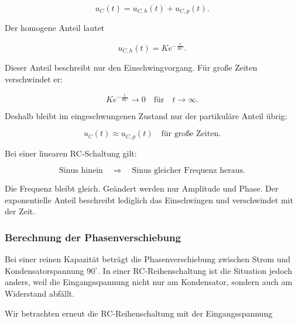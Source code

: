 \begin{equation}
	u_C(t)
	=
	u_{C,h}(t)
	+
	u_{C,p}(t).
	\label{eq:rc-vollstaendige-loesung-h-p}
\end{equation}

Der homogene Anteil lautet

\begin{equation}
	u_{C,h}(t)
	=
	K e^{-\frac{t}{RC}}.
	\label{eq:rc-homogener-anteil-erneut}
\end{equation}

Dieser Anteil beschreibt nur den Einschwingvorgang. Für große Zeiten
verschwindet er:

\begin{equation}
	K e^{-\frac{t}{RC}}
	\rightarrow 0
	\quad \text{für} \quad t \rightarrow \infty.
	\label{eq:rc-homogener-anteil-verschwindet-erneut}
\end{equation}

Deshalb bleibt im eingeschwungenen Zustand nur der partikuläre Anteil übrig:

\begin{equation}
	u_C(t)
	\approx
	u_{C,p}(t)
	\quad \text{für große Zeiten}.
	\label{eq:rc-eingeschwungener-zustand}
\end{equation}

\begin{DidacticBox}
	\label{box:rc-merksatz-stationaere-loesung}
	Bei einer linearen RC-Schaltung gilt:
	
	\[
	\text{Sinus hinein} \quad \Longrightarrow \quad \text{Sinus gleicher Frequenz heraus}.
	\]
	
	Die Frequenz bleibt gleich. Geändert werden nur Amplitude und Phase.
	Der exponentielle Anteil beschreibt lediglich das Einschwingen und verschwindet
	mit der Zeit.
\end{DidacticBox}


\subsubsection{Berechnung der Phasenverschiebung}
\label{subsubsec:rc-berechnung-phasenverschiebung}

Bei einer reinen Kapazität beträgt die Phasenverschiebung zwischen Strom und
Kondensatorspannung \(90^\circ\). In einer RC-Reihenschaltung ist die Situation
jedoch anders, weil die Eingangsspannung nicht nur am Kondensator, sondern auch
am Widerstand abfällt.

Wir betrachten erneut die RC-Reihenschaltung mit der Eingangsspannung

